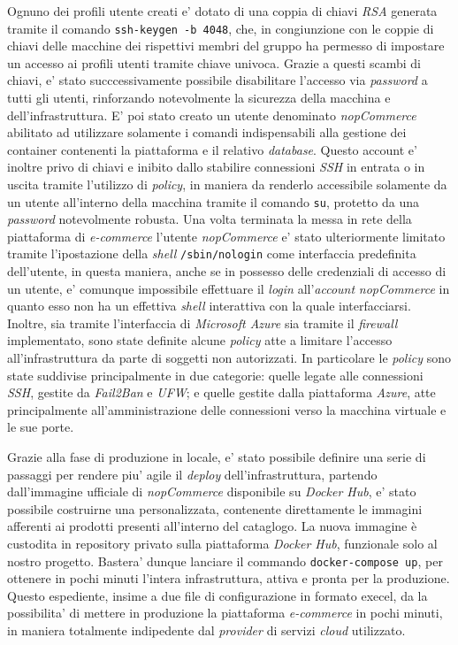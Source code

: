 \documentclass[a4paper]{report}
\begin{document}
		Ognuno dei profili utente creati e' dotato di una coppia di chiavi \emph{RSA} generata tramite il comando
		\texttt{ssh-keygen -b 4048}, che, in congiunzione con le coppie di chiavi delle macchine dei rispettivi membri
		del gruppo ha permesso di impostare un accesso ai profili utenti tramite chiave univoca. 
		Grazie a questi scambi di chiavi, e' stato succcessivamente possibile disabilitare l'accesso via \emph{password}
		a tutti gli utenti, rinforzando notevolmente la sicurezza della macchina e dell'infrastruttura. E' poi stato
		creato un utente denominato \emph{nopCommerce} abilitato ad utilizzare solamente i comandi indispensabili alla
		gestione dei container contenenti la piattaforma e il relativo \emph{database}. Questo account e' inoltre privo
		di chiavi e inibito dallo stabilire connessioni \emph{SSH} in entrata o in uscita tramite l'utilizzo di
		\emph{policy}, in maniera da renderlo accessibile solamente da un utente all'interno della macchina tramite il
		comando \texttt{su}, protetto da una \emph{password} notevolmente robusta. Una volta terminata la messa in rete
		della piattaforma di \emph{e-commerce} l'utente \emph{nopCommerce} e' stato ulteriormente limitato tramite
		l'ipostazione della \emph{shell} \texttt{/sbin/nologin} come interfaccia predefinita dell'utente, in questa
		maniera, anche se in possesso delle credenziali di accesso di un utente, e' comunque impossibile effettuare il
		\emph{login} all'\emph{account} \emph{nopCommerce} in quanto esso non ha un effettiva \emph{shell} interattiva
		con la quale interfacciarsi.
		Inoltre, sia tramite l'interfaccia di \emph{Microsoft Azure} sia tramite il \emph{firewall} implementato, sono
		state definite alcune \emph{policy} atte a limitare l'accesso all'infrastruttura da parte di soggetti non
		autorizzati. In particolare le \emph{policy} sono state suddivise principalmente in due categorie: quelle legate
		alle connessioni \emph{SSH}, gestite da \emph{Fail2Ban} e \emph{UFW}; e quelle gestite dalla piattaforma
		\emph{Azure}, atte principalmente all'amministrazione delle connessioni verso la macchina virtuale e le sue
		porte.

		Grazie alla fase di produzione in locale, e' stato possibile definire una serie di passaggi per rendere piu'
		agile il \emph{deploy} dell'infrastruttura, partendo dall'immagine ufficiale di \emph{nopCommerce} disponibile
		su \emph{Docker Hub}, e' stato possibile costruirne una personalizzata, contenente direttamente le immagini
		afferenti ai prodotti presenti all'interno del cataglogo.  La nuova immagine è custodita in repository privato
		sulla piattaforma \emph{Docker Hub}, funzionale solo al nostro progetto.  Bastera' dunque lanciare il commando
		\texttt{docker-compose up}, per ottenere in pochi minuti l'intera infrastruttura, attiva e pronta per la
		produzione.  Questo espediente, insime a due file di configurazione in formato execel, da la possibilita' di
		mettere in produzione la piattaforma \emph{ e-commerce} in pochi minuti, in maniera totalmente indipedente dal
		\emph{provider} di servizi \emph{cloud} utilizzato.
\end{document}
